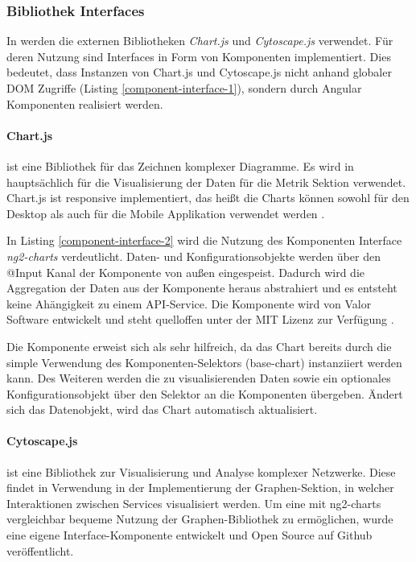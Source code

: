 \subsubsection{Bibliothek Interfaces}

In \projectname{} werden die externen Bibliotheken \emph{Chart.js} und \emph{Cytoscape.js} verwendet.
Für deren Nutzung sind Interfaces in Form von Komponenten implementiert.
Dies bedeutet, dass Instanzen von Chart.js und Cytoscape.js nicht anhand globaler \ac{DOM} Zugriffe (Listing \ref{component-interface-1}),
sondern durch Angular Komponenten realisiert werden.


\paragraph{Chart.js} ist eine Bibliothek für das Zeichnen komplexer Diagramme.
Es wird in \projectname{} hauptsächlich für die Visualisierung der Daten für die Metrik Sektion verwendet.
Chart.js ist responsive implementiert, das heißt die Charts können sowohl für den Desktop
als auch für die Mobile Applikation verwendet werden \cite{Chart80:online}.

\vspace{0.3cm}



\vspace{0.3cm}
In Listing \ref{component-interface-2} wird die Nutzung des Komponenten Interface \emph{ng2-charts} verdeutlicht.
Daten- und Konfigurationsobjekte werden über den @Input Kanal der Komponente von außen eingespeist.
Dadurch wird die Aggregation der Daten aus der Komponente heraus abstrahiert und es entsteht keine Ahängigkeit zu einem API-Service.
Die Komponente wird von Valor Software entwickelt und steht quelloffen unter der MIT Lizenz zur Verfügung \cite{valor6:online}.

Die Komponente erweist sich als sehr hilfreich, da das Chart bereits durch die simple Verwendung des Komponenten-Selektors (base-chart) instanziiert werden kann.
Des Weiteren werden die zu visualisierenden Daten sowie ein optionales Konfigurationsobjekt über den Selektor an die Komponenten übergeben.
Ändert sich das Datenobjekt, wird das Chart automatisch aktualisiert.



\paragraph{Cytoscape.js}
ist eine Bibliothek zur Visualisierung und Analyse komplexer Netzwerke.
Diese findet in \projectname{} Verwendung in der Implementierung der Graphen-Sektion,
in welcher Interaktionen zwischen Services visualisiert werden.
Um eine mit ng2-charts vergleichbar bequeme Nutzung der Graphen-Bibliothek zu ermöglichen,
wurde eine eigene Interface-Komponente entwickelt und Open Source auf Github veröffentlicht.

